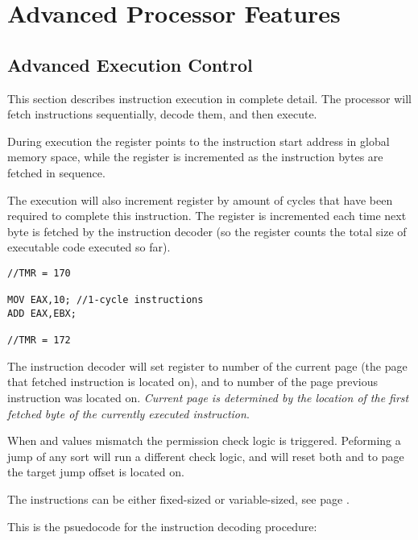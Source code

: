 \chapter{Advanced Processor Features} \label{advfeatures}

\section{Advanced Execution Control} \label{advexecution}
This section describes instruction execution in complete detail. The processor will fetch instructions sequentially, decode them, and then execute.

During execution the  register points to the instruction start address in global memory space, while the  register is incremented as the instruction bytes are fetched in sequence.

The execution will also increment  register by amount of cycles that have been required to complete this instruction. The  register is incremented each time next byte is fetched by the instruction decoder (so the  register counts the total size of executable code executed so far).

\begin{verbatim}
//TMR = 170

MOV EAX,10; //1-cycle instructions
ADD EAX,EBX;

//TMR = 172
\end{verbatim}

The instruction decoder will set  register to number of the current page (the page that fetched instruction is located on), and  to number of the page previous instruction was located on. \emph{Current page is determined by the location of the first fetched byte of the currently executed instruction}.

When  and  values mismatch the permission check logic is triggered. Peforming a jump of any sort will run a different check logic, and will reset both  and  to page the target jump offset is located on.

The instructions can be either fixed-sized or variable-sized, see page \pageref{localexec}.

This is the psuedocode for the instruction decoding procedure:

